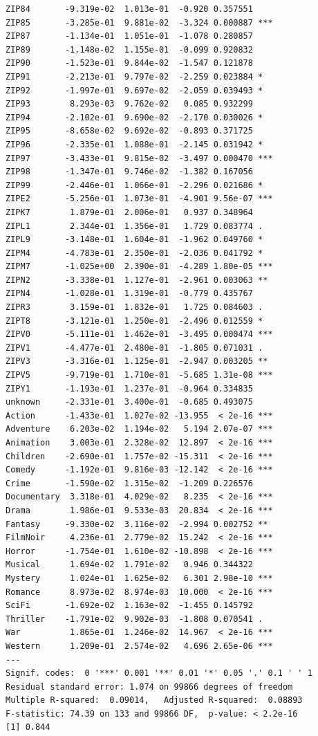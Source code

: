 \documentclass[11pt]{article}
\begin{document}
\begin{verbatim}
ZIP84       -9.319e-02  1.013e-01  -0.920 0.357551    
ZIP85       -3.285e-01  9.881e-02  -3.324 0.000887 ***
ZIP87       -1.134e-01  1.051e-01  -1.078 0.280857    
ZIP89       -1.148e-02  1.155e-01  -0.099 0.920832    
ZIP90       -1.523e-01  9.844e-02  -1.547 0.121878    
ZIP91       -2.213e-01  9.797e-02  -2.259 0.023884 *  
ZIP92       -1.997e-01  9.697e-02  -2.059 0.039493 *  
ZIP93        8.293e-03  9.762e-02   0.085 0.932299    
ZIP94       -2.102e-01  9.690e-02  -2.170 0.030026 *  
ZIP95       -8.658e-02  9.692e-02  -0.893 0.371725    
ZIP96       -2.335e-01  1.088e-01  -2.145 0.031942 *  
ZIP97       -3.433e-01  9.815e-02  -3.497 0.000470 ***
ZIP98       -1.347e-01  9.746e-02  -1.382 0.167056    
ZIP99       -2.446e-01  1.066e-01  -2.296 0.021686 *  
ZIPE2       -5.256e-01  1.073e-01  -4.901 9.56e-07 ***
ZIPK7        1.879e-01  2.006e-01   0.937 0.348964    
ZIPL1        2.344e-01  1.356e-01   1.729 0.083774 .  
ZIPL9       -3.148e-01  1.604e-01  -1.962 0.049760 *  
ZIPM4       -4.783e-01  2.350e-01  -2.036 0.041792 *  
ZIPM7       -1.025e+00  2.390e-01  -4.289 1.80e-05 ***
ZIPN2       -3.338e-01  1.127e-01  -2.961 0.003063 ** 
ZIPN4       -1.028e-01  1.319e-01  -0.779 0.435767    
ZIPR3        3.159e-01  1.832e-01   1.725 0.084603 .  
ZIPT8       -3.121e-01  1.250e-01  -2.496 0.012559 *  
ZIPV0       -5.111e-01  1.462e-01  -3.495 0.000474 ***
ZIPV1       -4.477e-01  2.480e-01  -1.805 0.071031 .  
ZIPV3       -3.316e-01  1.125e-01  -2.947 0.003205 ** 
ZIPV5       -9.719e-01  1.710e-01  -5.685 1.31e-08 ***
ZIPY1       -1.193e-01  1.237e-01  -0.964 0.334835    
unknown     -2.331e-01  3.400e-01  -0.685 0.493075    
Action      -1.433e-01  1.027e-02 -13.955  < 2e-16 ***
Adventure    6.203e-02  1.194e-02   5.194 2.07e-07 ***
Animation    3.003e-01  2.328e-02  12.897  < 2e-16 ***
Children    -2.690e-01  1.757e-02 -15.311  < 2e-16 ***
Comedy      -1.192e-01  9.816e-03 -12.142  < 2e-16 ***
Crime       -1.590e-02  1.315e-02  -1.209 0.226576    
Documentary  3.318e-01  4.029e-02   8.235  < 2e-16 ***
Drama        1.986e-01  9.533e-03  20.834  < 2e-16 ***
Fantasy     -9.330e-02  3.116e-02  -2.994 0.002752 ** 
FilmNoir     4.236e-01  2.779e-02  15.242  < 2e-16 ***
Horror      -1.754e-01  1.610e-02 -10.898  < 2e-16 ***
Musical      1.694e-02  1.791e-02   0.946 0.344322    
Mystery      1.024e-01  1.625e-02   6.301 2.98e-10 ***
Romance      8.973e-02  8.974e-03  10.000  < 2e-16 ***
SciFi       -1.692e-02  1.163e-02  -1.455 0.145792    
Thriller    -1.791e-02  9.902e-03  -1.808 0.070541 .
War          1.865e-01  1.246e-02  14.967  < 2e-16 ***
Western      1.209e-01  2.574e-02   4.696 2.65e-06 ***
---
Signif. codes:  0 '***' 0.001 '**' 0.01 '*' 0.05 '.' 0.1 ' ' 1
Residual standard error: 1.074 on 99866 degrees of freedom
Multiple R-squared:  0.09014,   Adjusted R-squared:  0.08893
F-statistic: 74.39 on 133 and 99866 DF,  p-value: < 2.2e-16
[1] 0.844
\end{verbatim}
\end{document}
